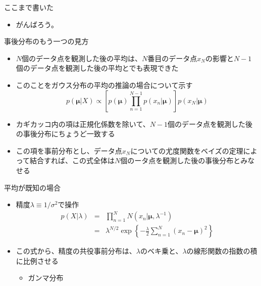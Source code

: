 \begin{frame}{ここまで書いた}
 \begin{itemize}
  \item がんばろう。
 \end{itemize}
\end{frame}

\begin{frame}{事後分布のもう一つの見方}
 \begin{itemize}
  \item $N$個のデータ点を観測した後の平均は、$N$番目のデータ点$x_N$の影響と$N-1$個のデータ点を観測した後の平均とでも表現できた
  \item このことをガウス分布の平均の推論の場合について示す
        \begin{equation}
         p(\bm{\mu}|X) \propto \left[p(\bm{\mu})\prod_{n=1}^{N-1}p(x_n|\bm{\mu})\right]p(x_N|\bm{\mu})
        \end{equation}
  \item カギカッコ内の項は正規化係数を除いて、$N-1$個のデータ点を観測した後の事後分布にちょうど一致する
  \item この項を事前分布とし、データ点$x_N$についての尤度関数をベイズの定理によって結合すれば、この式全体は$N$個のータ点を観測した後の事後分布とみなせる
 \end{itemize}
\end{frame}

\begin{frame}{平均が既知の場合}
 \begin{itemize}
  \item 精度$\lambda\equiv 1/\sigma^2$で操作
        \begin{eqnarray}
         p(X|\lambda) &=& \prod_{n=1}^{N}N(x_n|\bm{\mu},\lambda^{-1}) \nonumber \\
         &=& \lambda^{N/2}\exp\left\{-\frac{\lambda}{2}\sum_{n=1}^{N}(x_n-\bm{\mu})^2\right\}\label{114403_19Nov14}
        \end{eqnarray}
  \item この式から、精度の共役事前分布は、$\lambda$のベキ乗と、$\lambda$の線形関数の指数の積に比例させる
        \begin{itemize}
         \item \alert{ガンマ分布}
        \end{itemize}
 \end{itemize}
\end{frame}


